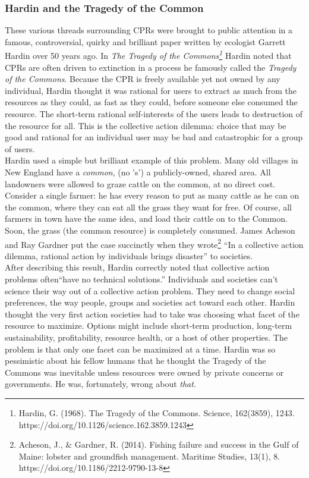 \subsubsection{Hardin and the Tragedy of the Common} 
These various threads surrounding CPRs were brought to public attention in a famous, controversial, quirky and brilliant paper written by ecologist Garrett Hardin over 50 years ago. In \textit{The Tragedy of the Commons\footnote{Hardin, G. (1968). The Tragedy of the Commons. Science, 162(3859), 1243. https://doi.org/10.1126/science.162.3859.1243}} Hardin noted that CPRs are often driven to extinction in a process he famously called the \textit{Tragedy of the Commons}. Because the CPR is freely available yet not owned by any individual, Hardin thought it was rational for users to extract as much from the resources as they could, as fast as they could, before someone else consumed the resource. The short-term rational self-interests of the users leads to destruction of the resource for all. This is the collective action dilemma: choice that may be good and rational for an individual user may be bad and catastrophic for a group of users. \\

Hardin used a simple but brilliant example of this problem. Many old villages in New England have a \emph{common}, (no 's') a publicly-owned, shared area. All landowners were allowed to graze cattle on the common, at no direct cost. Consider a single farmer: he has every reason to put as many cattle as he can on the common, where they can eat all the grass they want for free. Of course, all farmers in town have the same idea, and load their cattle on to the Common. Soon, the grass (the common resource) is completely consumed. James Acheson and Ray Gardner put the case succinctly when they wrote\footnote{Acheson, J., \& Gardner, R. (2014). Fishing failure and success in the Gulf of Maine: lobster and groundfish management. Maritime Studies, 13(1), 8. https://doi.org/10.1186/2212-9790-13-8} ``In a collective action dilemma, rational action by individuals brings disaster'' to societies.\\

After describing this result, Hardin correctly noted that collective action problems often``have no technical solutions.'' Individuals and societies can't science their way out of a collective action problem. They need to change social preferences, the way people, groups and societies act toward each other. Hardin thought the very first action societies had to take was choosing what facet of the resource to maximize.  Options might include short-term production, long-term sustainability, profitability, resource health, or a host of other properties. The problem is that only one facet can be maximized at a time. Hardin was so pessimistic about his fellow humans that he thought the Tragedy of the Commons was inevitable unless resources were owned by private concerns or governments. He was, fortunately, wrong about \emph{that}.\\

